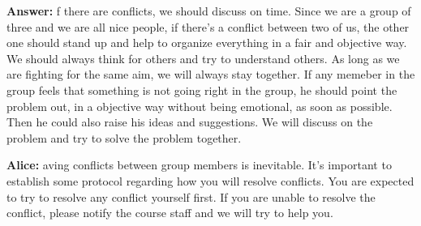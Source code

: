 \documentclass[12pt]{article}
\newenvironment{answer}[1]{
\color{blue}
	{\bf Answer:}
}{
}
\newenvironment{alice}[1]{
\color{magenta}
	{\bf Alice:}
}{
}
\begin{document}
\begin{itemize}
\begin{answer}

If there are conflicts, we should discuss on time. Since we are a group of three and we are all nice people, if there's a conflict between two of us, the other one should stand up and help to organize everything in a fair and objective way. We should always think for others and try to understand others. As long as we are fighting for the same aim, we will always stay together.
If any memeber in the group feels that something is not going right in the group, he should point the problem out, in a objective way without being emotional, as soon as possible. Then he could also raise his ideas and suggestions. We will discuss on the problem and try to solve the problem together.
\end{answer}

\begin{alice}

Having conflicts between group members is inevitable.  It's important to establish some protocol regarding how you will resolve conflicts.  You are expected to try to resolve any conflict yourself first.  If you are unable to resolve the conflict, please notify the course staff and we will try to help you.

\end{alice}

\end{itemize}
\end{document}
